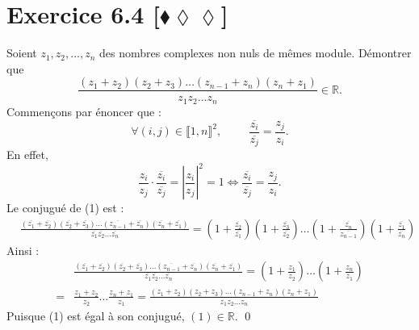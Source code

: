 \documentclass[10pt]{article}
\begin{document}

\section*{Exercice 6.4 [$\blacklozenge\lozenge\lozenge$]}
\begin{tcolorbox}[enhanced, width=7in, center, size=fbox, fontupper=\large, drop shadow southwest]
    Soient $z_1,z_2,\dots,z_n$ des nombres complexes non nuls de mêmes module. Démontrer que
    \begin{equation}
        \frac{(z_1 + z_2)(z_2 + z_3)\dots(z_{n-1}+z_n)(z_n + z_1)}{z_1z_2\dots z_n} \in \mathbb{R}.
    \end{equation}
    Commençons par énoncer que :
    \begin{equation*}
        \forall{(i,j)\in\llbracket1,n\rrbracket^2}, \hspace{1cm} \frac{\overline{z_i}}{\overline{z_j}}=\frac{z_j}{z_i}.
    \end{equation*}
    En effet,
    \begin{equation*}
        \frac{z_i}{z_j}\cdot\frac{\overline{z_i}}{\overline{z_j}}=\left|\frac{z_i}{z_j}\right|^2=1 \iff \frac{\overline{z_i}}{\overline{z_j}}=\frac{z_j}{z_i}.
    \end{equation*}
    Le conjugué de (1) est :
    \begin{align*}
        &\frac{(\overline{z_1} + \overline{z_2})(\overline{z_2} + \overline{z_3})\dots(\overline{z_{n-1}}+\overline{z_n})(\overline{z_n} + \overline{z_1})}{\overline{z_1}\overline{z_2}\dots\overline{z_n}}=(1+\frac{\overline{z_2}}{\overline{z_1}})(1+\frac{\overline{z_3}}{\overline{z_2}})\dots(1+\frac{\overline{z_n}}{\overline{z_{n-1}}})(1+\frac{\overline{z_1}}{\overline{z_n}})
    \end{align*}
    Ainsi :
    \begin{align*}
        &\frac{(\overline{z_1} + \overline{z_2})(\overline{z_2} + \overline{z_3})\dots(\overline{z_{n-1}}+\overline{z_n})(\overline{z_n} + \overline{z_1})}{\overline{z_1}\overline{z_2}\dots\overline{z_n}}=(1+\frac{z_1}{z_2})\dots(1+\frac{z_n}{z_1})\\
        =&\frac{z_1+z_2}{z_2}\dots\frac{z_n+z_1}{z_1}=\frac{(z_1+z_2)(z_2+z_3)\dots(z_{n-1}+z_n)(z_n+z_1)}{z_1z_2\dots z_n}
    \end{align*}
    Puisque (1) est égal à son conjugué, $(1) \in \mathbb{R}$.
    \qed
\end{tcolorbox}

\end{document}
